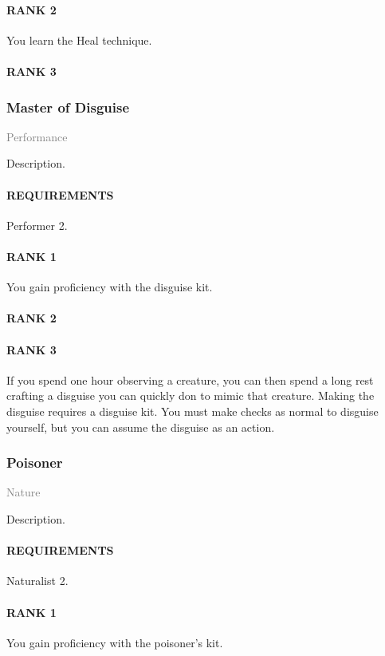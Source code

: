 \paragraph{RANK 2} You learn the Heal technique.
\paragraph{RANK 3}

\subsubsection{Master of Disguise} \label{feat::masterofdisguise}
\small{\textcolor{gray}{Performance}}

\normalsize
Description.
\paragraph{REQUIREMENTS} Performer 2.
\paragraph{RANK 1} You gain proficiency with the disguise kit.
\paragraph{RANK 2}
\paragraph{RANK 3} If you spend one hour observing a creature, you can then spend a long rest crafting a disguise you can quickly don to mimic that creature.
Making the disguise requires a disguise kit.
You must make checks as normal to disguise yourself, but you can assume the disguise as an action.

\subsubsection{Poisoner} \label{feat::poisoner}
\small{\textcolor{gray}{Nature}}

\normalsize
Description.
\paragraph{REQUIREMENTS} Naturalist 2.
\paragraph{RANK 1} You gain proficiency with the poisoner's kit.
